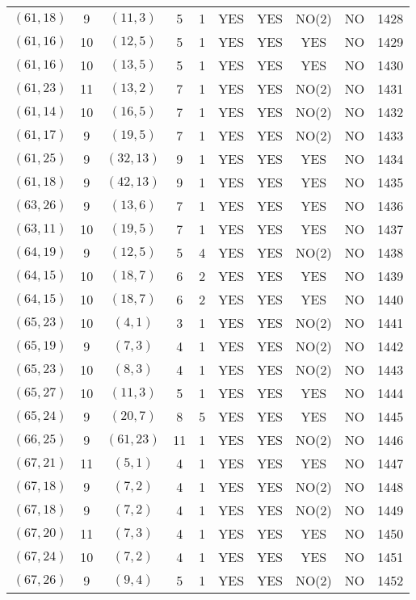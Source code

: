 \begin{longtable}{|c|c|c|c|c|c|c|c|c|c|}
$(61, 18)$ & 9 & $(11, 3)$ & 5 & 1 & YES & YES & NO(2) & NO & 1428\\
$(61, 16)$ & 10 & $(12, 5)$ & 5 & 1 & YES & YES & YES & NO & 1429\\
$(61, 16)$ & 10 & $(13, 5)$ & 5 & 1 & YES & YES & YES & NO & 1430\\
$(61, 23)$ & 11 & $(13, 2)$ & 7 & 1 & YES & YES & NO(2) & NO & 1431\\
$(61, 14)$ & 10 & $(16, 5)$ & 7 & 1 & YES & YES & NO(2) & NO & 1432\\
$(61, 17)$ & 9 & $(19, 5)$ & 7 & 1 & YES & YES & NO(2) & NO & 1433\\
$(61, 25)$ & 9 & $(32, 13)$ & 9 & 1 & YES & YES & YES & NO & 1434\\
$(61, 18)$ & 9 & $(42, 13)$ & 9 & 1 & YES & YES & YES & NO & 1435\\
$(63, 26)$ & 9 & $(13, 6)$ & 7 & 1 & YES & YES & YES & NO & 1436\\
$(63, 11)$ & 10 & $(19, 5)$ & 7 & 1 & YES & YES & YES & NO & 1437\\
$(64, 19)$ & 9 & $(12, 5)$ & 5 & 4 & YES & YES & NO(2) & NO & 1438\\
$(64, 15)$ & 10 & $(18, 7)$ & 6 & 2 & YES & YES & YES & NO & 1439\\
$(64, 15)$ & 10 & $(18, 7)$ & 6 & 2 & YES & YES & YES & NO & 1440\\
$(65, 23)$ & 10 & $(4, 1)$ & 3 & 1 & YES & YES & NO(2) & NO & 1441\\
$(65, 19)$ & 9 & $(7, 3)$ & 4 & 1 & YES & YES & NO(2) & NO & 1442\\
$(65, 23)$ & 10 & $(8, 3)$ & 4 & 1 & YES & YES & NO(2) & NO & 1443\\
$(65, 27)$ & 10 & $(11, 3)$ & 5 & 1 & YES & YES & YES & NO & 1444\\
$(65, 24)$ & 9 & $(20, 7)$ & 8 & 5 & YES & YES & YES & NO & 1445\\
$(66, 25)$ & 9 & $(61, 23)$ & 11 & 1 & YES & YES & NO(2) & NO & 1446\\
$(67, 21)$ & 11 & $(5, 1)$ & 4 & 1 & YES & YES & YES & NO & 1447\\
$(67, 18)$ & 9 & $(7, 2)$ & 4 & 1 & YES & YES & NO(2) & NO & 1448\\
$(67, 18)$ & 9 & $(7, 2)$ & 4 & 1 & YES & YES & NO(2) & NO & 1449\\
$(67, 20)$ & 11 & $(7, 3)$ & 4 & 1 & YES & YES & YES & NO & 1450\\
$(67, 24)$ & 10 & $(7, 2)$ & 4 & 1 & YES & YES & YES & NO & 1451\\
$(67, 26)$ & 9 & $(9, 4)$ & 5 & 1 & YES & YES & NO(2) & NO & 1452\\

\end{longtable}
